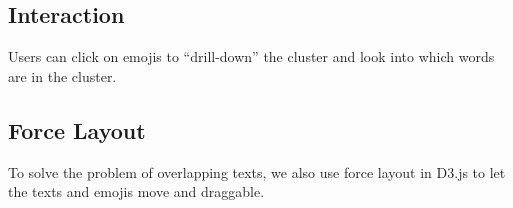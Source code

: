 \subsection{Interaction}
Users can click on emojis to ``drill-down'' \cite{Elmqvist:2010:HAI:1749404.1749525} the cluster and look into which words are in the cluster.


\subsection{Force Layout}
To solve the problem of overlapping texts, we also use force layout in D3.js to let the texts and emojis move and draggable. 
